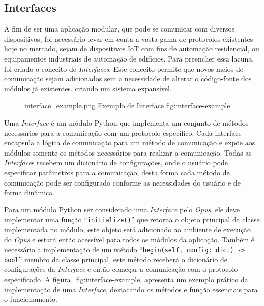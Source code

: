 \subsection{\textbf{Interfaces}}
\label{opus-sec:interfaces}

A fim de ser uma aplicação modular, que pode se comunicar com diversos dispositivos, foi necessário levar em conta a vasta 
gama de protocolos existentes hoje no mercado, sejam de dispositivos IoT com fins de automação residencial, ou equipamentos industriais
de automação de edifícios. Para preencher essa lacuna, foi criado o conceito de \emph{Interfaces}. Este conceito permite que novos meios de
comunicação sejam adicionados sem a necessidade de alterar o código-fonte dos módulos já existentes, criando um sistema expansível.
\begin{figure}[h!]
    {interface_example.png}
    {Exemplo de Interface}
    {fig:interface-example}
\end{figure}

Uma \emph{Interface} é um módulo Python que implementa um conjunto de métodos necessários para a comunicação com um protocolo específico. Cada interface
encapsula a lógica de comunicação para um método de comunicação e expõe aos módulos somente os métodos necessários para realizar a comunicação.
Todas as \emph{Interface}s recebem um dicionário de configurações, onde o usuário pode especificar parâmetros para a comunicação, desta forma
cada método de comunicação pode ser configurado conforme as necessidades do usuário e de forma dinâmica.

Para um módulo Python ser considerado uma \emph{Interface} pelo \emph{Opus}, ele deve implementar uma função ``\lstinline{initialize()}'' que retorna o objeto 
principal da classe implementada no módulo, este objeto será adicionado ao ambiente de execução do \emph{Opus} e estará então acessível para todos os módulos 
da aplicação. Também é necessário a implementação de um método ``\lstinline{begin(self, config: dict) -> bool}'' membro da classe principal, este método 
receberá o dicionário de configurações da \emph{Interface} e então começar a comunicação com o protocolo especificado. 
A figura~\ref{fig:interface-example} apresenta um exemplo prático da implementação de uma \emph{Interface}, destacando os métodos e função 
essenciais para o funcionamento.

